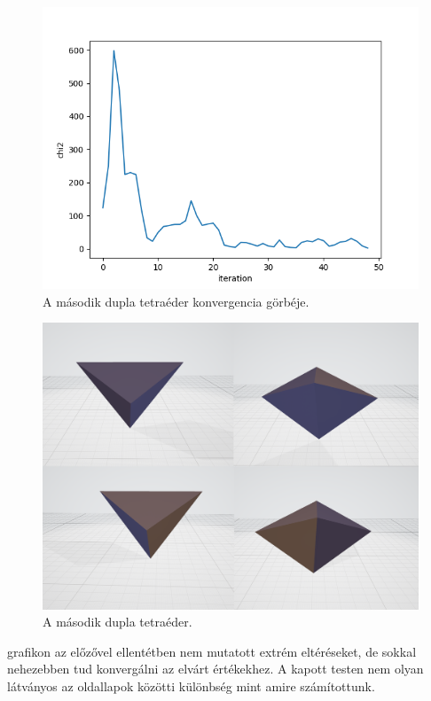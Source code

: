 \begin{figure}[h!]
	\centering
	\includegraphics[scale=0.7]{images/doubletetrahedron_02.png}
	\caption{A második dupla tetraéder konvergencia görbéje.}
	\label{fig:doubletetra02}
\end{figure}

\begin{figure}[h!]
	\centering
	\includegraphics[width=\textwidth]{images/double02obj.png}
	\caption{A második dupla tetraéder.}
	\label{fig:double02obj}
\end{figure}

 grafikon az előzővel ellentétben nem mutatott extrém eltéréseket, de sokkal nehezebben tud konvergálni az elvárt értékekhez.
A kapott testen nem olyan látványos az oldallapok közötti különbség mint amire számítottunk.

